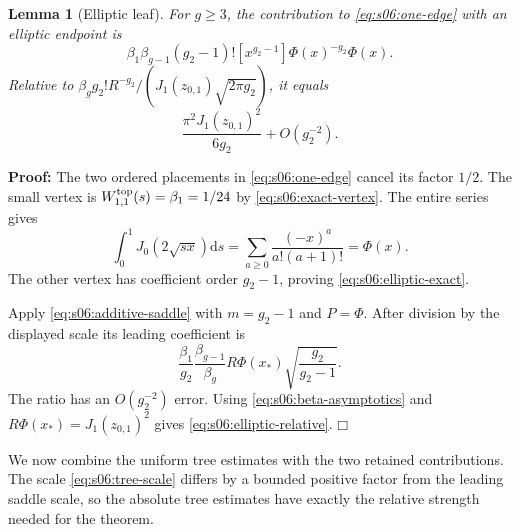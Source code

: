 \documentclass[a4paper,10pt]{article}
\numberwithin{equation}{section}
\newcommand{\dd}{\mathrm{d}}
\theoremstyle{paperplain}
\newtheorem{lmm}[thm]{Lemma}
\theoremstyle{paperremark}
\theoremstyle{paperplain}
\newenvironment{prf}{\noindent \textbf{Proof: }}{\hfill $\mdlgwhtsquare$\par\addvspace{0.5\baselineskip}}
\begin{document}
\begin{lmm}[Elliptic leaf]\label{lmm:s06:elliptic-leaf}
For $g\geq3$, the contribution to \eqref{eq:s06:one-edge} with
an elliptic endpoint is
\begin{equation}\label{eq:s06:elliptic-exact}
 \beta_1\beta_{g-1}(g_2-1)!
 [x^{g_2-1}]\Phi(x)^{-g_2}\Phi(x).
\end{equation}
Relative to
$\beta_g g_2!R^{-g_2}/(J_1(z_{0,1})\sqrt{2\pi g_2})$,
it equals
\begin{equation}\label{eq:s06:elliptic-relative}
 \frac{\pi^2J_1(z_{0,1})^2}{6g_2}+O(g_2^{-2}).
\end{equation}
\end{lmm}
\begin{prf}
The two ordered placements in \eqref{eq:s06:one-edge} cancel
its factor $1/2$. The small vertex is
$W^{\rm top}_{1,1}(s)=\beta_1=1/24$ by
\eqref{eq:s06:exact-vertex}. The entire series gives
\[
 \int_0^1J_0(2\sqrt{s x})\dd s
    =\sum_{a\geq0}\frac{(-x)^a}{a!(a+1)!}=\Phi(x).
\]
The other vertex has coefficient order $g_2-1$, proving
\eqref{eq:s06:elliptic-exact}.

Apply \eqref{eq:s06:additive-saddle} with $m=g_2-1$ and
$P=\Phi$. After division by the displayed scale its leading
coefficient is
\[
 \frac{\beta_1}{g_2}\frac{\beta_{g-1}}{\beta_g}
     R\Phi(x_*)\sqrt{\frac{g_2}{g_2-1}}.
\]
The ratio has an $O(g_2^{-2})$ error. Using
\eqref{eq:s06:beta-asymptotics} and
$R\Phi(x_*)=J_1(z_{0,1})^2$ gives
\eqref{eq:s06:elliptic-relative}.
\end{prf}

We now combine the uniform tree estimates with the two retained
contributions. The scale \eqref{eq:s06:tree-scale} differs by a
bounded positive factor from the leading saddle scale, so the
absolute tree estimates have exactly the relative strength needed
for the theorem.
\end{document}
